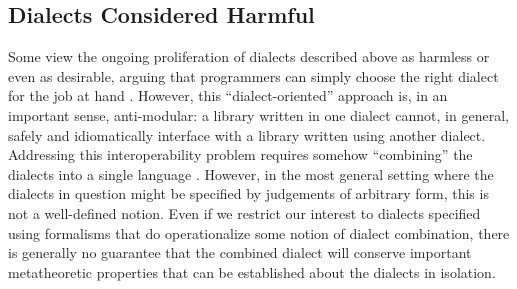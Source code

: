 \subsection{Dialects Considered Harmful}
Some  view the ongoing proliferation of dialects described above as harmless or even as desirable, arguing that programmers can simply choose the right dialect for the job at hand \cite{journals/stp/Ward94}. However, this ``dialect-oriented'' approach is, in an important sense, anti-modular: a library written in one dialect cannot, in general, safely and idiomatically interface with a library written using another dialect. 
Addressing this interoperability problem requires somehow ``combining'' the  dialects into a single language \cite{Benton:1999:IWW:317636.317791}. However, in the most general setting where the dialects in question might be specified by judgements of arbitrary form, this is not a well-defined notion. Even if we restrict our interest to dialects specified using formalisms that do operationalize some notion of dialect combination, there is generally no guarantee that the combined dialect will conserve important metatheoretic properties that can be established about the dialects in isolation. %
